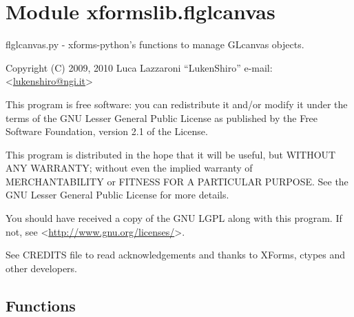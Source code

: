 %
%
%


\section{Module xformslib.flglcanvas}

    \label{xformslib:flglcanvas}

flglcanvas.py - xforms-python's functions to manage GLcanvas objects.

Copyright (C) 2009, 2010  Luca Lazzaroni ``LukenShiro''
e-mail: <\href{mailto:lukenshiro@ngi.it}{lukenshiro@ngi.it}>

This program is free software: you can redistribute it and/or modify
it under the terms of the GNU Lesser General Public License as
published by the Free Software Foundation, version 2.1 of the License.

This program is distributed in the hope that it will be useful,
but WITHOUT ANY WARRANTY; without even the implied warranty of
MERCHANTABILITY or FITNESS FOR A PARTICULAR PURPOSE. See the
GNU Lesser General Public License for more details.

You should have received a copy of the GNU LGPL along with this
program. If not, see <\href{http://www.gnu.org/licenses/}{http://www.gnu.org/licenses/}>.

See CREDITS file to read acknowledgements and thanks to XForms,
ctypes and other developers.


  \subsection{Functions}

    \label{xformslib:flglcanvas:fl_add_glcanvas}

